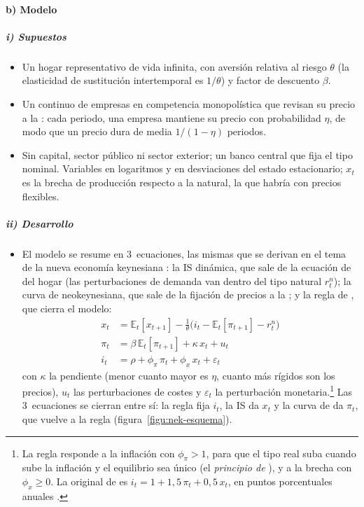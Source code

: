 \documentclass[11pt]{article}
\begin{document}
\paragraph{b) Modelo}

\subparagraph{i) Supuestos}
\begin{itemize}
\item Un hogar representativo de vida infinita, con aversión relativa al riesgo $\theta$ (la elasticidad de sustitución intertemporal es $1/\theta$) y factor de descuento $\beta$.
\item Un continuo de empresas en competencia monopolística que revisan su precio a la : cada periodo, una empresa mantiene su precio con probabilidad $\eta$, de modo que un precio dura de media $1/(1-\eta)$ periodos\nocite{Calvo1983Staggered}.
\item Sin capital, sector público ni sector exterior; un banco central que fija el tipo nominal. Variables en logaritmos y en desviaciones del estado estacionario; $x_t$ es la brecha de producción respecto a la natural, la que habría con precios flexibles.
\end{itemize}

\subparagraph{ii) Desarrollo}
\begin{itemize}
\item El modelo se resume en 3~ecuaciones, las mismas que se derivan en el tema de la nueva economía keynesiana : la IS dinámica, que sale de la ecuación de  del hogar (las perturbaciones de demanda van dentro del tipo natural $r^n_t$); la curva de  neokeynesiana, que sale de la fijación de precios a la ; y la regla de , que cierra el modelo:
  \begin{align}
  x_t&=\mathbb{E}_t[x_{t+1}]-\frac{1}{\theta}\big(i_t-\mathbb{E}_t[\pi_{t+1}]-r^n_t\big) \label{eq:is-dinamica}\\
  \pi_t&=\beta\,\mathbb{E}_t[\pi_{t+1}]+\kappa\,x_t+u_t \label{eq:nkpc}\\
  i_t&=\rho+\phi_\pi\,\pi_t+\phi_x\,x_t+\varepsilon_t \label{eq:taylor}
  \end{align}
  con $\kappa$ la pendiente (menor cuanto mayor es $\eta$, cuanto más rígidos son los precios), $u_t$ las perturbaciones de costes\nocite{ClaridaGaliGertler1999Science} y $\varepsilon_t$ la perturbación monetaria.\footnote{La regla responde a la inflación con $\phi_\pi>1$, para que el tipo real suba cuando sube la inflación y el equilibrio sea único (el \emph{principio de }), y a la brecha con $\phi_x\geq0$. La original de \textcite{Taylor1993} es $i_t=1+1{,}5\,\pi_t+0{,}5\,x_t$, en puntos porcentuales anuales .} Las 3~ecuaciones se cierran entre sí: la regla fija $i_t$, la IS da $x_t$ y la curva de  da $\pi_t$, que vuelve a la regla (figura~\ref{figu:nek-esquema}).
\end{itemize}
\end{document}
